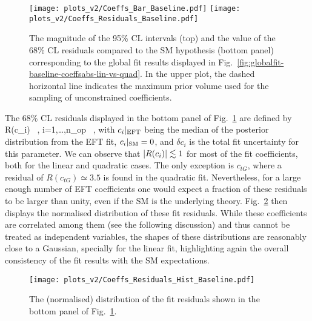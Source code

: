 \begin{figure}[t]
  \begin{center}
 \texttt{[image: plots\_v2/Coeffs\_Bar\_Baseline.pdf]}
 \texttt{[image: plots\_v2/Coeffs\_Residuals\_Baseline.pdf]}
 \vspace{-0.3cm}
 \caption{\small The magnitude of the 95\% CL intervals (top)
   and the value of the 68\% CL residuals compared to the SM hypothesis (bottom panel)
   corresponding to the global fit results
   displayed in Fig.~\ref{fig:globalfit-baseline-coeffsabs-lin-vs-quad}.
   In the upper plot, the dashed horizontal line indicates the maximum
   prior volume used for the sampling of unconstrained coefficients.
         \label{fig:globalfit-baseline-bounds-lin-vs-quad} }
  \end{center}
\end{figure}

The 68\% CL residuals displayed in the bottom panel of
Fig.~\ref{fig:globalfit-baseline-bounds-lin-vs-quad} are defined by
\be
\label{eq:fit_residual}
R(c_i)\equiv {} \, ,\qquad
i=1,\ldots,n_{\rm op} \, ,
\ee
with $c_i|_{\rm EFT}$ being the median of the posterior distribution
from the EFT fit, $c_i|_{\rm SM}=0$, and $\delta c_i$ is the total fit uncertainty
for this parameter.
%
We can observe that $|R(c_i)|\lesssim 1$ for most of the fit coefficients,
both for the linear and quadratic cases.
%
The only exception is $c_{tG}$, where a residual of
$R(c_{tG})\simeq 3.5$ is found in the quadratic fit.
%
Nevertheless, for a large enough number of EFT coefficients
one would expect a fraction of these residuals to be larger than
unity, even if the SM is the
underlying theory.
%
Fig.~\ref{fig:residuals-histo} then displays
the normalised distribution of
these fit residuals.
%
While these coefficients are correlated among them (see the
following discussion) and thus
cannot be treated as independent variables,
the shapes of these distributions are reasonably close
to a Gaussian, specially for the linear fit, highlighting
again the overall consistency of the fit results
with the SM expectations.

\begin{figure}[t]
  \begin{center}
\texttt{[image: plots\_v2/Coeffs\_Residuals\_Hist\_Baseline.pdf]}
    \vspace{-0.2cm}
    \caption{\small The (normalised) distribution of
      the fit residuals shown in the bottom panel of
      Fig.~\ref{fig:globalfit-baseline-bounds-lin-vs-quad}.
     \label{fig:residuals-histo} }
  \end{center}
\end{figure}


